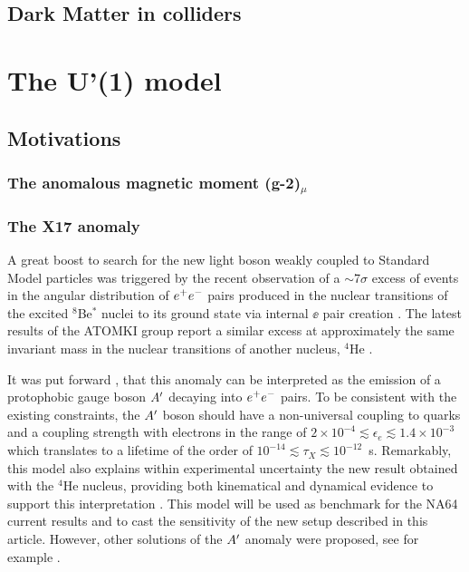 \subsection{Dark Matter in colliders}
\label{ch1:sec:dm-colliders}

\section{The U'(1) model}
\label{ch1:sec:dm-u1model}

\subsection{Motivations}
\label{ch1:sec:dm-u1model-motivations}

\subsubsection{The anomalous magnetic moment (g-2)$_{\mu}$}
\label{ch1:sec:dm-u1model-motivations-g2}

\subsubsection{The X17 anomaly}
\label{ch1:sec:dm-u1model-motivations-x17}

A great boost to search for the new light boson weakly coupled to Standard Model particles was triggered by the recent observation of a $\sim$7$\sigma$ excess of events in the angular distribution of $e^+e^-$ pairs produced in the nuclear transitions of the excited $^8$Be$^*$ nuclei to its ground state via internal $\ee$ pair creation \cite{Krasznahorkay:2015iga}. The latest results of the ATOMKI group report a similar excess at approximately the same invariant mass in the nuclear transitions of another nucleus, $^4$He \cite{Krasznahorkay:2019lyl}.

It was put forward  \cite{Feng:2016jff,PhysRevD.95.035017}, that this anomaly can be interpreted as the emission of a protophobic gauge boson $A'$ decaying into $e^+e^-$ pairs. To be consistent with the existing constraints, the $A'$ boson should have a non-universal coupling to quarks and a coupling strength with electrons in the range of $2\times 10^{-4} \lesssim \epsilon_e \lesssim 1.4\times 10^{-3}$ which translates to a lifetime of the order of $10^{-14}\lesssim \tau_X \lesssim 10^{-12}$~s. Remarkably, this model also explains within experimental uncertainty the new result obtained with the $^4$He nucleus, providing both kinematical and dynamical evidence to support this interpretation \cite{Feng:2020mbt}. This model will be used as benchmark for the NA64 current results and to cast the sensitivity of the new setup described in this article. However, other solutions of the $A'$ anomaly were proposed, see for example \cite{Nam:2019osu, Seto:2016pks}.

